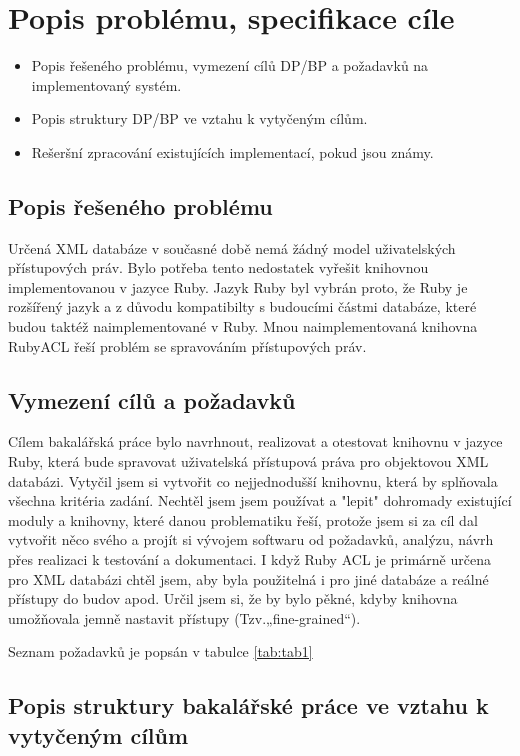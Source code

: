 \chapter{Popis problému, specifikace cíle}

\begin{itemize}
\item Popis řešeného problému, vymezení cílů DP/BP a požadavků na implementovaný systém.
\item Popis struktury DP/BP ve vztahu k vytyčeným cílům.
\item Rešeršní zpracování existujících implementací, pokud jsou známy.
\end{itemize}

\section{Popis řešeného problému}

Určená XML databáze v současné době nemá žádný model uživatelských přístupových práv. Bylo potřeba tento nedostatek vyřešit knihovnou implementovanou v jazyce Ruby. Jazyk Ruby byl vybrán proto, že Ruby je rozšířený jazyk a z důvodu kompatibilty s  budoucími částmi databáze, které budou taktéž naimplementované v Ruby. Mnou naimplementovaná knihovna RubyACL řeší problém se spravováním přístupových práv.

\section{Vymezení cílů a požadavků}
Cílem bakalářská práce bylo navrhnout, realizovat a otestovat knihovnu v jazyce Ruby, která bude spravovat uživatelská přístupová práva pro objektovou XML databázi.
Vytyčil jsem si vytvořit co nejjednodušší knihovnu, která by splňovala všechna kritéria zadání. Nechtěl jsem jsem používat a "lepit" dohromady existující moduly a knihovny, které danou problematiku řeší, protože jsem si za cíl dal vytvořit něco svého a projít si vývojem softwaru od požadavků, analýzu, návrh přes realizaci k testování a dokumentaci. 
I když Ruby ACL je primárně určena pro XML databázi chtěl jsem, aby byla použitelná i pro jiné databáze a reálné přístupy do budov apod.
Určil jsem si, že by bylo pěkné, kdyby knihovna umožňovala jemně nastavit přístupy (Tzv.„fine-grained“).

Seznam požadavků je popsán v tabulce  \ref{tab:tab1}

\section{Popis struktury bakalářské práce ve vztahu k vytyčeným cílům}

